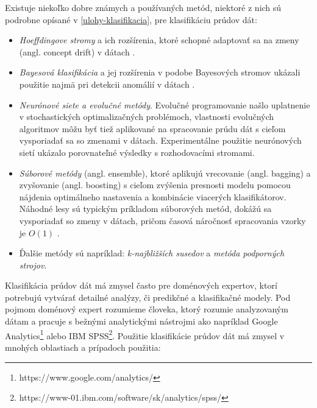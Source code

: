 Existuje niekoľko dobre známych a používaných metód, niektoré z nich sú podrobne opísané v \ref{ulohy-klasifikacia}, pre klasifikáciu prúdov dát:
\begin{itemize}
	\item \textit{Hoeffdingove stromy} a ich rozšírenia, ktoré schopné adaptovať sa na zmeny (angl. concept drift) v dátach \citep{hulten2001mining, bifet2009adaptive}.
	\item \textit{Bayesová klasifikácia} a jej rozšírenia v podobe Bayesových stromov ukázali použitie najmä pri detekcii anomálií v dátach \citep{hill2007real}.
	\item \textit{Neurónové siete a evolučné metódy}. Evolučné programovanie našlo uplatnenie v stochastických optimalizačných problémoch, vlastnosti evolučných algoritmov môžu byť tiež aplikované na spracovanie prúdu dát s cieľom vysporiadať sa so zmenami v dátach. Experimentálne použitie neurónových sietí ukázalo porovnateľné výsledky s rozhodovacími stromami.
	\item \textit{Súborové metódy} (angl. ensemble), ktoré aplikujú vrecovanie (angl. bagging) a zvyšovanie (angl. boosting) s cieľom zvýšenia presnosti modelu pomocou nájdenia optimálneho nastavenia a kombinácie viacerých klasifikátorov. Náhodné lesy sú typickým príkladom súborových metód, dokážú sa vysporiadať so zmeny v dátach, pričom časová náročnosť spracovania vzorky je $O(1)$ \citep{abdulsalam2011classification}.
	\item Ďalšie metódy sú napríklad: \textit{k-najbližších susedov} a \textit{metóda podporných strojov}.
\end{itemize}

Klasifikácia prúdov dát má zmysel často pre doménových expertov, ktorí potrebujú vytvárať detailné analýzy, či predikčné a klasifikačné modely. Pod pojmom doménový expert rozumieme človeka, ktorý rozumie analyzovaným dátam a pracuje s bežnými analytickými nástrojmi ako napríklad Google Analytics\footnote{https://www.google.com/analytics/
} alebo IBM SPSS\footnote{https://www-01.ibm.com/software/sk/analytics/spss/}. Použitie klasifikácie prúdov dát má zmysel v mnohých oblastiach a prípadoch použitia:

